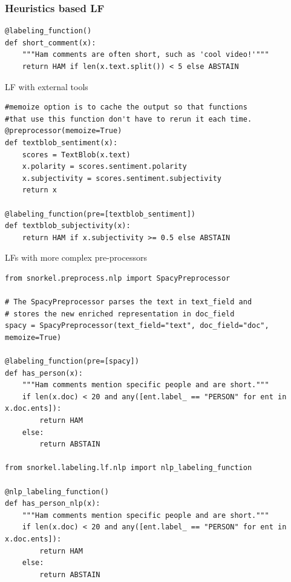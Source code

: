 \documentclass{beamer}
\begin{document}
\begin{frame}[fragile]
\frametitle{Heuristics based LF}
\small
\begin{verbatim}
@labeling_function()
def short_comment(x):
    """Ham comments are often short, such as 'cool video!'"""
    return HAM if len(x.text.split()) < 5 else ABSTAIN
\end{verbatim}
\end{frame}

\begin{frame}[fragile]{LF with external tools}
    \small
\begin{verbatim}
#memoize option is to cache the output so that functions 
#that use this function don't have to rerun it each time. 
@preprocessor(memoize=True)
def textblob_sentiment(x):
    scores = TextBlob(x.text)
    x.polarity = scores.sentiment.polarity
    x.subjectivity = scores.sentiment.subjectivity
    return x

@labeling_function(pre=[textblob_sentiment])
def textblob_subjectivity(x):
    return HAM if x.subjectivity >= 0.5 else ABSTAIN
\end{verbatim}
\end{frame}

\begin{frame}[fragile]{LFs with more complex pre-processors}
\tiny
    \begin{verbatim}
from snorkel.preprocess.nlp import SpacyPreprocessor

# The SpacyPreprocessor parses the text in text_field and
# stores the new enriched representation in doc_field
spacy = SpacyPreprocessor(text_field="text", doc_field="doc", memoize=True)

@labeling_function(pre=[spacy])
def has_person(x):
    """Ham comments mention specific people and are short."""
    if len(x.doc) < 20 and any([ent.label_ == "PERSON" for ent in x.doc.ents]):
        return HAM
    else:
        return ABSTAIN

from snorkel.labeling.lf.nlp import nlp_labeling_function

@nlp_labeling_function()
def has_person_nlp(x):
    """Ham comments mention specific people and are short."""
    if len(x.doc) < 20 and any([ent.label_ == "PERSON" for ent in x.doc.ents]):
        return HAM
    else:
        return ABSTAIN

    \end{verbatim}
\end{frame}
\end{document}
